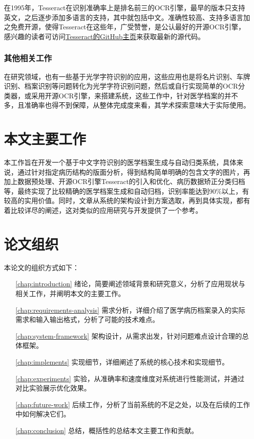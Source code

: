 在1995年，Tesseract在识别准确率上是排名前三的OCR引擎，最早的版本只支持英文，之后逐步添加多语言的支持，其中就包括中文。准确性较高、支持多语言加之免费开源，使得Tesseract在这些年，广受赞誉，是公认最好的开源OCR引擎，感兴趣的读者可访问\href{https://github.com/tesseract-ocr/tesseract}{Tesseract的GitHub主页}来获取最新的源代码。

\subsubsection{其他相关工作}
在研究领域，也有一些基于光学字符识别的应用\citep{SongWan, HongfengLi, TikunHu}，这些应用也是将名片识别、车牌识别、档案识别等问题转化为光学字符识别问题，然后或自行实现简单的OCR分类器，或采用开源OCR引擎，来搭建系统，这些工作中，针对医学档案的并不多\citep{MinghuaXiang}，且准确率也得不到保障，从整体完成度来看，其学术探索意味大于实际使用。

\section{本文主要工作}
本工作旨在开发一个基于中文字符识别的医学档案生成与自动归类系统，具体来说，通过针对指定病历结构的版面分析，得到结构简单明确的包含文字的图片，再加上数据预处理、开源OCR引擎Tesseract的引入和优化、病历数据矫正分类归档等，最终实现了比较精确的医学档案生成和自动归档，识别率能达到90\%以上，有较高的实用价值。同时，文章从系统的架构设计到方案选取，再到具体实现，都有着比较详尽的阐述，这对类似的应用研究与开发提供了一个参考。

\section{论文组织}
本论文的组织方式如下：
\begin{itemize}
	\item[\autoref{chap:introduction}]
	绪论，简要阐述领域背景和研究意义，分析了应用现状与相关工作，并阐明本文的主要工作。
	\item[\autoref{chap:requirements-analysis}] 需求分析，详细介绍了医学病历档案录入的实际需求和输入输出格式，分析了可能的技术难点。
	\item[\autoref{chap:system-framework}]
	架构设计，从需求出发，针对问题难点设计合理的总体框架。
	\item[\autoref{chap:implements}]
	实现细节，详细阐述了系统的核心技术和实现细节。
	\item[\autoref{chap:experiments}]
	实验，从准确率和速度维度对系统进行性能测试，并通过对比实验展示优化效果。
	\item[\autoref{chap:future-work}]
	后续工作，分析了当前系统的不足之处，以及在后续的工作中如何解决它们。
	\item[\autoref{chap:conclusion}]
	总结，概括性的总结本文主要工作和贡献。
\end{itemize}
